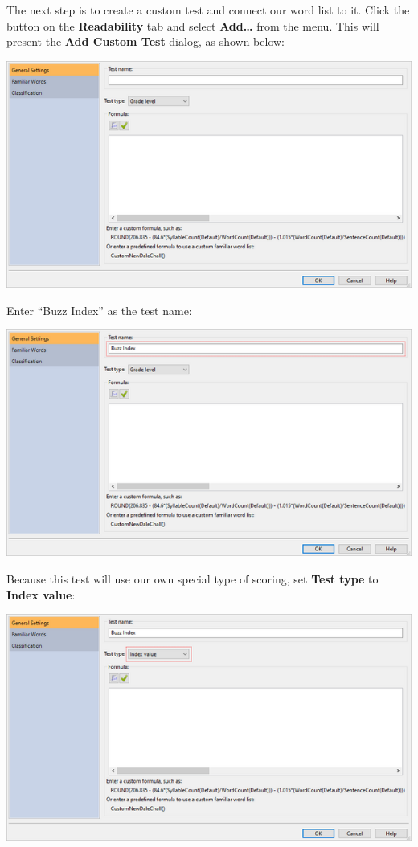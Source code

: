 \documentclass[
]{book}
\theoremstyle{definition}
\theoremstyle{definition}
\theoremstyle{definition}
\theoremstyle{definition}
\theoremstyle{remark}
\begin{document}
The next step is to create a custom test and connect our word list to it. Click the  button on the \textbf{Readability} tab and select \textbf{Add\ldots{}} from the menu. This will present the \protect\hyperlink{custom-test-general-settings}{\textbf{Add Custom Test}} dialog, as shown below:

\includegraphics{Images/AddCustomTest.png}

Enter ``Buzz Index'' as the test name:

\includegraphics{Images/CustomIndexTestExampleName.png}

Because this test will use our own special type of scoring, set \textbf{Test type} to \textbf{Index value}:

\includegraphics{Images/CustomIndexTestExampleTestType.png}
\end{document}
